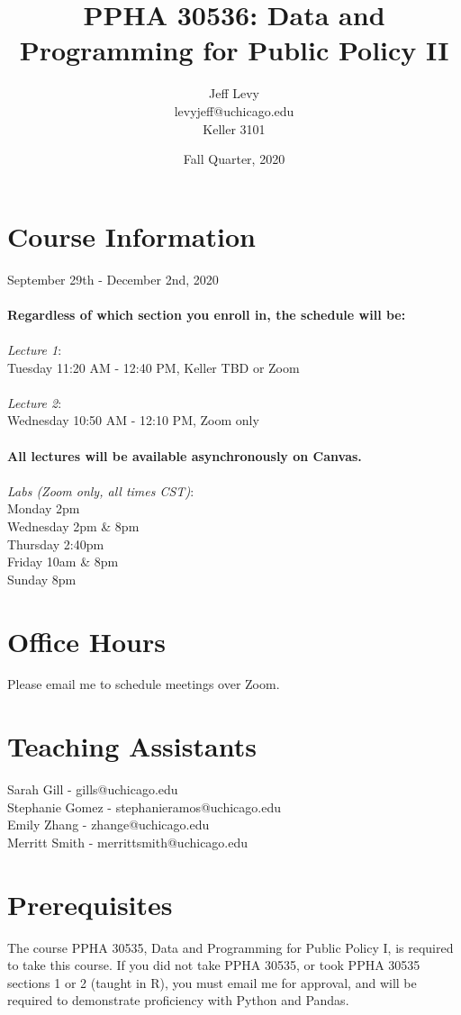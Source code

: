 \documentclass{article}
\author{
Jeff Levy\\
levyjeff@uchicago.edu\\
Keller 3101
}
\title{PPHA 30536: Data and Programming for Public Policy II}
\date{Fall Quarter, 2020}
\begin{document}
\maketitle

\section*{Course Information}
September 29th - December 2nd, 2020 \\
\\
\textbf{Regardless of which section you enroll in, the schedule will be:} \\
\\
\emph{Lecture 1}: \\
Tuesday 11:20 AM - 12:40 PM, Keller TBD or Zoom \\
\\
\emph{Lecture 2}: \\
Wednesday 10:50 AM - 12:10 PM, Zoom only \\ 
 \\
\textbf{All lectures will be available asynchronously on Canvas.} \\
\\
\emph{Labs (Zoom only, all times CST)}:\\
Monday 2pm \\
Wednesday 2pm \& 8pm \\
Thursday 2:40pm \\
Friday 10am \& 8pm \\
Sunday 8pm 

\section*{Office Hours}
Please email me to schedule meetings over Zoom.

\section*{Teaching Assistants}
Sarah Gill - gills@uchicago.edu \\
Stephanie Gomez - stephanieramos@uchicago.edu \\
Emily Zhang - zhange@uchicago.edu \\
Merritt Smith - merrittsmith@uchicago.edu

\section*{Prerequisites}
The course PPHA 30535, Data and Programming for Public Policy I, is required to take this course.  If you did not take PPHA 30535, or took PPHA 30535 sections 1 or 2 (taught in R), you must email me for approval, and will be required to demonstrate proficiency with Python and Pandas.
\end{document}
